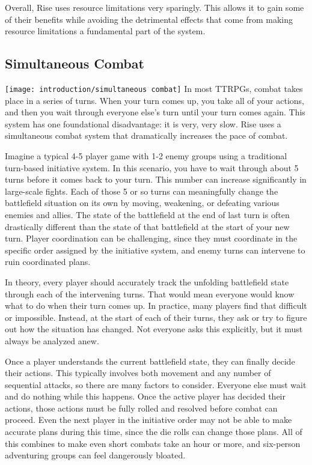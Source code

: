     Overall, Rise uses resource limitations very sparingly.
    This allows it to gain some of their benefits while avoiding the detrimental effects that come from making resource limitations a fundamental part of the system.

  \subsection{Simultaneous Combat}
    \texttt{[image: introduction/simultaneous combat]}
    In most TTRPGs, combat takes place in a series of turns.
    When your turn comes up, you take all of your actions, and then you wait through everyone else's turn until your turn comes again.
    This system has one foundational disadvantage: it is very, very slow.
    Rise uses a simultaneous combat system that dramatically increases the pace of combat.

    Imagine a typical 4-5 player game with 1-2 enemy groups using a traditional turn-based initiative system.
    In this scenario, you have to wait through about 5 turns before it comes back to your turn.
    This number can increase significantly in large-scale fights.
    Each of those 5 or so turns can meaningfully change the battlefield situation on its own by moving, weakening, or defeating various enemies and allies.
    The state of the battlefield at the end of last turn is often drastically different than the state of that battlefield at the start of your new turn.
    Player coordination can be challenging, since they must coordinate in the specific order assigned by the initiative system, and enemy turns can intervene to ruin coordinated plans.

    In theory, every player should accurately track the unfolding battlefield state through each of the intervening turns.
    That would mean everyone would know what to do when their turn comes up.
    In practice, many players find that difficult or impossible.
    Instead, at the start of each of their turns, they ask or try to figure out how the situation has changed.
    Not everyone asks this explicitly, but it must always be analyzed anew.

    Once a player understands the current battlefield state, they can finally decide their actions.
    This typically involves both movement and any number of sequential attacks, so there are many factors to consider.
    Everyone else must wait and do nothing while this happens.
    Once the active player has decided their actions, those actions must be fully rolled and resolved before combat can proceed.
    Even the next player in the initiative order may not be able to make accurate plans during this time, since the die rolls can change those plans.
    All of this combines to make even short combats take an hour or more, and six-person adventuring groups can feel dangerously bloated.

